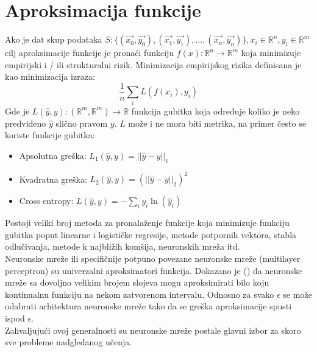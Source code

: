 \documentclass[a4paper,fleqn,12pt]{JMThesis}
\newcommand{\latin}{\fontencoding{T1}\selectfont\selectlanguage{english}}
\theoremstyle{plain}
\theoremstyle{definition}
\theoremstyle{definition}
\begin{document}
\section{Aproksimacija funkcije}
Ako je dat skup podataka $S: \{(\vec{x_0},\vec{y_0}),(\vec{x_1},\vec{y_1}),...,(\vec{x_n},\vec{y_n})\}, x_i \in \mathbb{R}^n, y_i \in \mathbb{R}^m$ cilj aproksimacije funkcije
je pronaći funkciju $f(x) : \mathbb{R}^n \rightarrow \mathbb{R}^m$ koja minimizuje empirijski i / ili strukturalni rizik. Minimizacija
empirijskog rizika definisana je kao minimizacija izraza:\\
\[ \frac{1}{n}\sum_i L(f(x_i),y_i) \]
Gde je $L(\hat{y},y) : (\mathbb{R}^m,\mathbb{R}^m) \rightarrow \mathbb{R}$ funkcija gubitka koja određuje koliko je neko predviđeno
$\hat{y}$ slično pravom $y$. $L$ može i ne mora biti metrika, na primer često se koriste funkcije gubitka:\\
\begin{itemize}
	\item Apsolutna greška: $L_1(\hat{y},y) = ||\hat{y} - y||_1$
 	\item Kvadratna greška: $L_2(\hat{y},y) = (||\hat{y} - y||_2)^2$
  	\item Cross entropy: $L(\hat{y},y) = -\sum_i y_i \ln(\hat{y}_i)$  
\end{itemize}
Postoji veliki broj metoda za pronalaženje funkcije koja minimizuje funkciju gubitka poput linearne i logističke regresije, 
metode potpornih vektora, stabla odlučivanja, metode k najbližih komšija, neuronskih mreža itd.\\
Neuronske mreže ili specifičnije potpuno povezane neuronske mreže (multilayer perceptron) su univerzalni aproksimatori funkcija.
Dokazano je (\latin \cite{hanin2017approximating}) da neuronske mreže sa dovoljno velikim brojem slojeva mogu aproksimirati
bilo koju kontinualnu funkciju na nekom zatvorenom intervalu. Odnosno za svako $\epsilon$ se može odabrati arhitektura neuronske
mreže tako da se greška aproksimacije spusti ispod $\epsilon$.\\
Zahvaljujući ovoj generalnosti su neuronske mreže postale glavni izbor za skoro sve probleme nadgledanog učenja.
\end{document}
